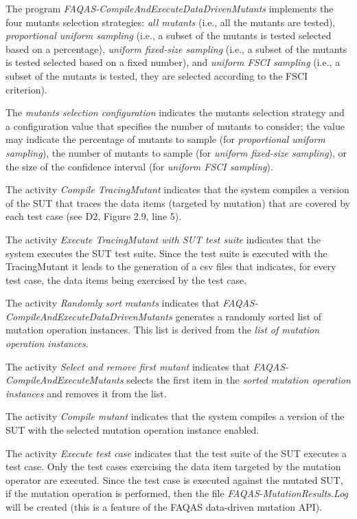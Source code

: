 The program \emph{FAQAS-CompileAndExecuteDataDrivenMutants} implements the four mutants selection strategies: \emph{all mutants} (i.e., all the mutants are tested), \emph{proportional uniform sampling} (i.e., a subset of the mutants is tested selected based on a percentage), \emph{uniform fixed-size sampling} (i.e., a subset of the mutants is tested selected based on a fixed number), and \emph{uniform FSCI sampling} (i.e., a subset of the mutants is tested, they are selected according to the FSCI criterion).

The \emph{mutants selection configuration} indicates the mutants selection strategy and a configuration value that specifies the number of mutants to consider; the value may indicate the percentage of mutants to sample (for \emph{proportional uniform sampling}), the number of mutants to sample (for \emph{uniform fixed-size sampling}), or the size of the confidence interval (for \emph{uniform FSCI sampling}).

The activity \emph{Compile TracingMutant} indicates that the system compiles a version of the SUT that traces the data items (targeted by mutation) that are covered by each test case (see D2, Figure 2.9, line 5).

The activity \emph{Execute TracingMutant with SUT test suite} indicates that the system executes the SUT test suite. Since the test suite is executed with the TracingMutant it leads to the generation of a csv files that indicates, for every test case, the data items being exercised by the test case.

The activity \emph{Randomly sort mutants} indicates that  \emph{FAQAS-CompileAndExecuteDataDrivenMutants} generates a randomly sorted list of mutation operation instances. This list is derived from the \emph{list of mutation operation instances}.

The activity \emph{Select and remove first mutant} indicates that  \emph{FAQAS-CompileAndExecuteMutants} selects the first item in the \emph{sorted mutation operation instances} and removes it from the list.

The activity \emph{Compile mutant} indicates that the system compiles a version of the SUT with the selected mutation operation instance enabled.

The activity \emph{Execute test case} indicates that the test suite of the SUT executes a test case. Only the test cases exercising the data item targeted by the mutation operator are executed. Since the test case is executed against the mutated SUT, if the mutation operation is performed, then the file \emph{FAQAS-MutationResults.Log} will be created (this is a feature of the FAQAS data-driven mutation API).

